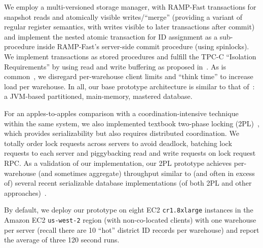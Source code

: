  We employ a multi-versioned
storage manager, with RAMP-Fast transactions for snapshot reads and
atomically visible writes/``merge'' (providing a variant of regular
register semantics, with writes visible to later transactions after
commit)~\cite{ramp-txns} and implement the nested atomic transaction
for ID assignment as a sub-procedure inside RAMP-Fast's server-side
commit procedure (using spinlocks). We implement transactions as
stored procedures and fulfill the TPC-C ``Isolation Requirements'' by
using read and write buffering as proposed in~\cite{hat-vldb}. As is
common~\cite{calvin,abadi-vll,hstore,jones-dtxn}, we disregard
per-warehouse client limits and ``think time'' to increase load per
warehouse. In all, our base prototype architecture is similar to that
of~\cite{ramp-txns}: a JVM-based partitioned, main-memory, mastered
database.

For an apples-to-apples comparison with a coordination-intensive
technique within the same system, we also implemented textbook
two-phase locking (2PL)~\cite{bernstein-book}, which provides
serializability but also requires distributed coordination. We totally
order lock requests across servers to avoid deadlock, batching lock
requests to each server and piggybacking read and write requests on
lock request RPC. As a validation of our implementation, our 2PL
prototype achieves per-warehouse (and sometimes aggregate) throughput
similar to (and often in excess of) several recent serializable
database implementations (of both 2PL and other
approaches)~\cite{calvin,abadi-vll,hstore,jones-dtxn}.

By default, we deploy our prototype on eight EC2 \texttt{cr1.8xlarge}
instances in the Amazon EC2 \texttt{us-west-2} region (with
non-co-located clients) with one warehouse per server (recall there
are 10 ``hot'' district ID records per warehouse) and report the
average of three 120 second runs.

